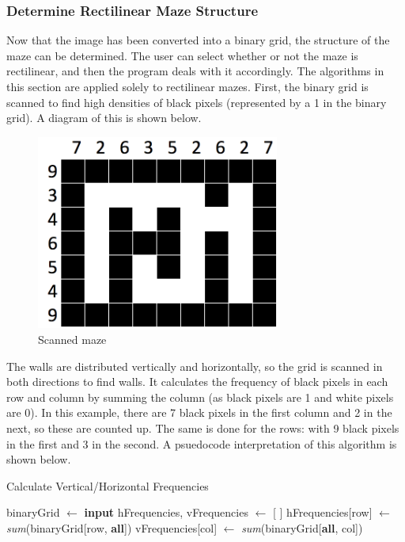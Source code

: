\documentclass[titlepage]{article}
\begin{document}
\subsubsection{Determine Rectilinear Maze Structure}
Now that the image has been converted into a binary grid, the structure of the maze can be determined. The user can select whether or not the maze is rectilinear, and then the program deals with it accordingly. The algorithms in this section are applied solely to rectilinear mazes. First, the binary grid is scanned to find high densities of black pixels (represented by a 1 in the binary grid). A diagram of this is shown below.

\begin{figure}[H]
  \centering
  \includegraphics[width=8cm]{maze_scan.png}
  \caption{Scanned maze}
  \label{fig:dijk}
\end{figure}

The walls are distributed vertically and horizontally, so the grid is scanned in both directions to find walls. It calculates the frequency of black pixels in each row and column by summing the column (as black pixels are 1 and white pixels are 0). In this example, there are 7 black pixels in the first column and 2 in the next, so these are counted up. The same is done for the rows: with 9 black pixels in the first and 3 in the second. A psuedocode interpretation of this algorithm is shown below.

\begin{algorithm}[H]
\caption{Calculate Vertical/Horizontal Frequencies}
\begin{algorithmic}[1]
	\State binaryGrid $\gets$ \textbf{input}
	\State hFrequencies, vFrequencies $\gets$ [ ]
		\State hFrequencies[row] $\gets$ \textit{sum}(binaryGrid[row, \textbf{all}])
        \EndFor
		\State vFrequencies[col] $\gets$ \textit{sum}(binaryGrid[\textbf{all}, col])
        \EndFor
\end{algorithmic}
\end{algorithm}
\end{document}
